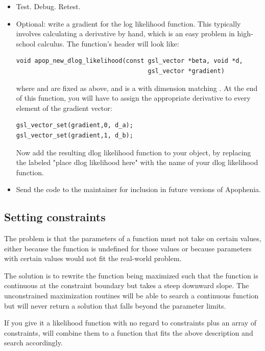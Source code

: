 \begin{itemize}
\item Test. Debug. Retest.

\item Optional: write a gradient for the log likelihood function. This
typically involves calculating a derivative by hand, which is an easy
problem in high-school calculus. The function's header will look like: 
\begin{lstlisting}
void apop_new_dlog_likelihood(const gsl_vector *beta, void *d, 
                                    gsl_vector *gradient)
\end{lstlisting}
where  and  are fixed as above, and  is a  with dimension matching . 
At the end of this function, you will have to assign the appropriate derivative to every element of the gradient vector:
\begin{lstlisting}
gsl_vector_set(gradient,0, d_a);
gsl_vector_set(gradient,1, d_b);
\end{lstlisting}
Now add the resulting dlog likelihood function to your object, by replacing the  labeled "place dlog likelihood here" with the name of your dlog likelihood function.
\item Send the code to the maintainer for inclusion in future versions of Apophenia.
\end{itemize}


\subsection{Setting
constraints}\label{constraintwriting}

The problem is that the parameters of a function must not take on
certain values, either because the function is undefined for those
values or because parameters with certain values would not fit the
real-world problem.

The solution is to rewrite the function being maximized such that the
function is continuous at the constraint boundary but takes a steep
downward slope. The unconstrained maximization routines will be able
to search a continuous function but will never return a solution that
falls beyond the parameter limits.

If you give it a likelihood function with no regard to constraints plus
an array of constraints,  will combine
them to a function that fits the above description and search accordingly.

